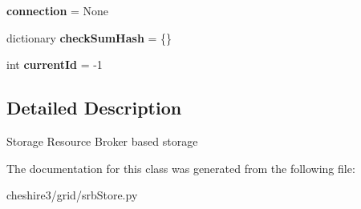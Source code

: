 \begin{DoxyCompactItemize}
\item 
\hypertarget{classcheshire3_1_1grid_1_1srb_store_1_1_srb_store_afc3d4e75d294988e1e244b0088bb7e90}{{\bfseries connection} = None}\label{classcheshire3_1_1grid_1_1srb_store_1_1_srb_store_afc3d4e75d294988e1e244b0088bb7e90}

\item 
\hypertarget{classcheshire3_1_1grid_1_1srb_store_1_1_srb_store_a95ddf9b1b5016adbf2403f5fa47ac945}{dictionary {\bfseries check\-Sum\-Hash} = \{\}}\label{classcheshire3_1_1grid_1_1srb_store_1_1_srb_store_a95ddf9b1b5016adbf2403f5fa47ac945}

\item 
\hypertarget{classcheshire3_1_1grid_1_1srb_store_1_1_srb_store_a81d73a94169a0bd5a2e21f7beb177f34}{int {\bfseries current\-Id} = -\/1}\label{classcheshire3_1_1grid_1_1srb_store_1_1_srb_store_a81d73a94169a0bd5a2e21f7beb177f34}

\end{DoxyCompactItemize}


\subsection{Detailed Description}
\begin{DoxyVerb}Storage Resource Broker based storage \end{DoxyVerb}
 

The documentation for this class was generated from the following file\-:\begin{DoxyCompactItemize}
\item 
cheshire3/grid/srb\-Store.\-py\end{DoxyCompactItemize}
